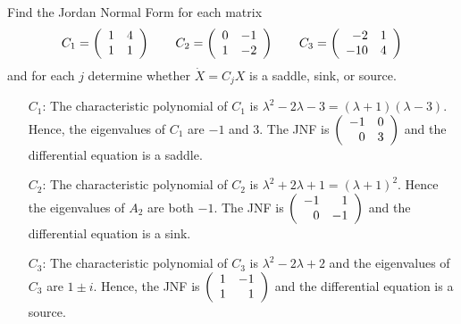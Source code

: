 \documentclass{ximera}
\author{Matthew Carr}
\begin{document}

\begin{exercise}\label{mc11_3A}

Find the Jordan Normal Form for each matrix 
\[
C_1 = \left(\begin{array}{rrrrrrrrrrrrrrrrrr}  1 & 4 \\ 1 & 1 \end{array}\right) \qquad C_2 = \left(\begin{array}{rrrrrrrrrrrrrrrrrr}  0 & -1 \\ 1 & -2  \end{array}\right) \qquad C_3 = \left(\begin{array}{rrrrrrrrrrrrrrrrrr}  -2 & 1 \\ -10 & 4 \end{array}\right)
\]
and for each $j$ determine whether $\dot{X} = C_jX$ is a saddle, sink, or source.
  
\begin{solution}


\soln 
\begin{itemize}
\item[$C_1$:] The characteristic polynomial of $C_1$ is $\lambda^2 -2\lambda -3 = (\lambda+1)(\lambda-3)$.  Hence, the eigenvalues of $C_1$ are $-1$ and $3$.  The JNF is $\left(\begin{array}{rrrrrrrrrrrrrrrrrr} -1 & 0 \\ 0 & 3 \end{array}\right)$ and the differential equation is a saddle.

\item[$C_2$:] The characteristic polynomial of $C_2$ is $\lambda^2 +2\lambda+ 1 = (\lambda+1)^2$.  Hence the eigenvalues of $A_2$ are both $-1$.  The JNF is $\left(\begin{array}{rrrrrrrrrrrrrrrrrr} -1 & 1 \\ 0 & -1 \end{array}\right)$ and the differential equation is a sink.

\item[$C_3$:] The characteristic polynomial of $C_3$ is $\lambda^2 - 2\lambda + 2$ and the eigenvalues of $C_3$ are $1 \pm i$.  Hence, the JNF is $\left(\begin{array}{rrrrrrrrrrrrrrrrrr} 1 & -1 \\ 1 & 1 \end{array}\right)$ and the differential equation is a source.
\end{itemize}

\end{solution}
\end{exercise}
\end{document}
